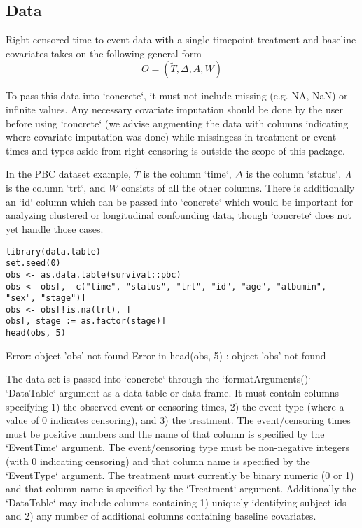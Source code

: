 \documentclass{report}
\newcommand{\1}{\ensuremath{\mathbf{1}}}
\newcommand{\T}{\ensuremath{\widetilde{T}}}
\renewcommand{\L}{\ensuremath{W}}
\begin{document}
\subsection{Data}
Right-censored time-to-event data with a single timepoint treatment and baseline covariates takes on the following general form
\[O = (\T, \Delta, A, \L) \]

To pass this data into `concrete`, it must not include missing (e.g. NA, NaN) or infinite values. Any necessary covariate imputation should be done by the user before using `concrete` (we advise augmenting the data with columns indicating where covariate imputation was done) while missingess in treatment or event times and types aside from right-censoring is outside the scope of this package.

In the PBC dataset example, \(\T\) is the column `time`, \(\Delta\) is the column `status`, \(A\) is the column `trt`, and \(\L\) consists of all the other columns. There is additionally an `id` column which can be passed into `concrete` which would be important for analyzing clustered or longitudinal confounding data, though `concrete` does not yet handle those cases. 

\begin{lstlisting}
library(data.table)
set.seed(0)
obs <- as.data.table(survival::pbc)
obs <- obs[,  c("time", "status", "trt", "id", "age", "albumin", "sex", "stage")]
obs <- obs[!is.na(trt), ]
obs[, stage := as.factor(stage)]
head(obs, 5)
\end{lstlisting}

Error: object 'obs' not found
Error in head(obs, 5) : object 'obs' not found

The data set is passed into `concrete` through the `formatArguments()` `DataTable` argument as a data table or data frame. It must contain columns specifying 1) the observed event or censoring times, 2) the event type (where a value of 0 indicates censoring), and 3) the treatment. The event/censoring times must be positive numbers and the name of that column is specified by the `EventTime` argument. The event/censoring type must be non-negative integers (with 0 indicating censoring) and that column name is specified by the `EventType` argument. The treatment must currently be binary numeric (0 or 1) and that column name is specified by the `Treatment` argument. Additionally the `DataTable` may include columns containing 1) uniquely identifying subject ids and 2) any number of additional columns containing baseline covariates.
\end{document}
